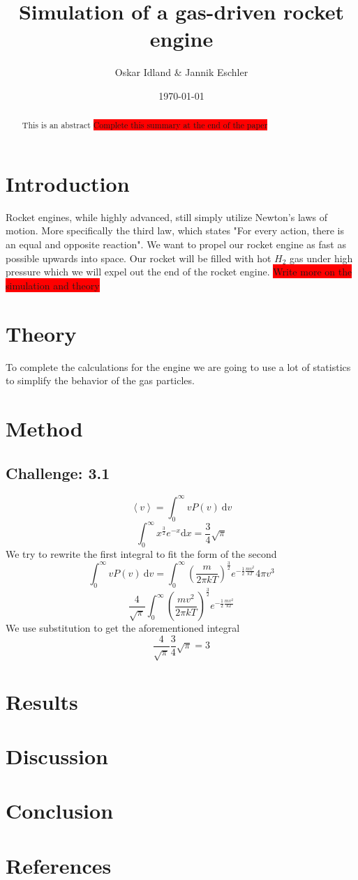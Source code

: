 \documentclass[reprint,english,notitlepage]{revtex4-2}
\begin{document}
\title{Simulation of a gas-driven rocket engine}
\author{Oskar Idland \& Jannik Eschler}
\date{\today}

\begin{abstract}
This is an abstract \colorbox{red}{Complete this summary at the end of the paper}
\end{abstract}
\maketitle

\section{Introduction}
	Rocket engines, while highly advanced, still simply utilize Newton's laws of motion. More specifically the third law, which states "For every action, there is an equal and opposite reaction". We want to propel our rocket engine as fast as possible upwards into space.
	Our rocket will be filled with hot $ H_2 $ gas under high pressure which we will expel out the end of the rocket engine. \colorbox{red}{Write more on the simulation and theory}
\section{Theory}
To complete the calculations for the engine we are going to use a lot of statistics to simplify the behavior of the gas particles. 
\section{Method}

	\subsection*{Challenge: 3.1}
		\[
		\left< v \right> = ∫  _{0}^{\infty} vP(v) \ \mathrm{d}v
		\]
		\[
		\int_{0}^{\infty} x^{\frac{3}{2}} e^{-x} \mathrm{d}x = \frac{3}{4} \sqrt{\pi}  
		\]
		We try to rewrite the first integral to fit the form of the second 
		\[
		\int _{0}^{\infty} vP(v) \ \mathrm{d}v = \int _{0}^{\infty} \left( \frac{m}{2 \pi k T} \right) ^{\frac{3}{2}} e ^{-\frac{1}{2} \frac{mv^{2}}{k T}} 4 \pi v^{3}
		\]
		\[
		\frac{4}{\sqrt{\pi}} \int _{0}^{\infty} \left( \frac{mv^{2}}{2 \pi k T} \right) ^{\frac{3}{2}} e ^{-\frac{1}{2} \frac{mv^{2}}{k T}} 
		\]
		We use substitution to get the aforementioned integral
		\[
		\frac{4}{\sqrt{\pi}} \frac{3}{4} \sqrt{\pi} = 3
		\]
	  

\section{Results}
\section{Discussion}
\section{Conclusion}
\section{References}
\end{document}
